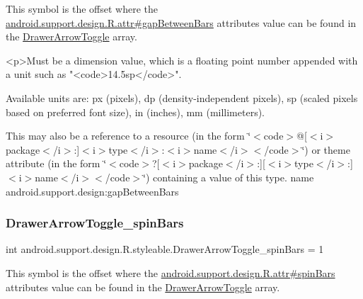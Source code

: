 This symbol is the offset where the \hyperlink{classandroid_1_1support_1_1design_1_1R_1_1attr_adbe39ebf03ed680b511ec8d065fa19cb}{android.\+support.\+design.\+R.\+attr\#gap\+Between\+Bars} attribute\textquotesingle{}s value can be found in the \hyperlink{classandroid_1_1support_1_1design_1_1R_1_1styleable_a559d22c78738e5161420dc4b41689c1b}{Drawer\+Arrow\+Toggle} array.

\begin{DoxyVerb}      <p>Must be a dimension value, which is a floating point number appended with a unit such as "<code>14.5sp</code>".
\end{DoxyVerb}
 Available units are\+: px (pixels), dp (density-\/independent pixels), sp (scaled pixels based on preferred font size), in (inches), mm (millimeters). 

This may also be a reference to a resource (in the form \char`\"{}$<$code$>$@\mbox{[}$<$i$>$package$<$/i$>$\+:\mbox{]}$<$i$>$type$<$/i$>$\+:$<$i$>$name$<$/i$>$$<$/code$>$\char`\"{}) or theme attribute (in the form \char`\"{}$<$code$>$?\mbox{[}$<$i$>$package$<$/i$>$\+:\mbox{]}\mbox{[}$<$i$>$type$<$/i$>$\+:\mbox{]}$<$i$>$name$<$/i$>$$<$/code$>$\char`\"{}) containing a value of this type.  name android.\+support.\+design\+:gap\+Between\+Bars \mbox{\label{classandroid_1_1support_1_1design_1_1R_1_1styleable_a927e817de79212ffbefd47a7d4fb1a1e}} 
\subsubsection{\texorpdfstring{Drawer\+Arrow\+Toggle\+\_\+spin\+Bars}{DrawerArrowToggle\_spinBars}}
{\footnotesize\ttfamily int android.\+support.\+design.\+R.\+styleable.\+Drawer\+Arrow\+Toggle\+\_\+spin\+Bars = 1\hspace{0.3cm}{\ttfamily [static]}}

This symbol is the offset where the \hyperlink{classandroid_1_1support_1_1design_1_1R_1_1attr_a8887867b280197a662e6b092f0ddcafe}{android.\+support.\+design.\+R.\+attr\#spin\+Bars} attribute\textquotesingle{}s value can be found in the \hyperlink{classandroid_1_1support_1_1design_1_1R_1_1styleable_a559d22c78738e5161420dc4b41689c1b}{Drawer\+Arrow\+Toggle} array.

